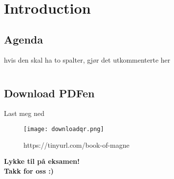 
\begin{frame}[t,plain]
    \titlepage
\end{frame}



\section{Introduction}
\subsection*{Agenda}
\begin{frame}
    
    hvis den skal ha to spalter, gjør det utkommenterte her
    \begin{columns}[t]
        \begin{column}{.5\textwidth}
            \tableofcontents[sections={1-6}]
        \end{column}
        \begin{column}{.5\textwidth}
            \tableofcontents[sections={7-}]
        \end{column}
    \end{columns}
\end{frame}


\subsection*{Download PDFen}
\begin{frame}{Last meg ned}
    \begin{figure}
        \centering
        \texttt{[image: downloadqr.png]}
        \caption{https://tinyurl.com/book-of-magne}
        \label{fig:qrcode}
    \end{figure}
\end{frame}


%




\begin{frame}
\begin{center}
\begin{Large}
\textbf{Lykke til på eksamen!\\[5mm]
Takk for oss :)}

\end{Large}
\end{center}  
\end{frame}